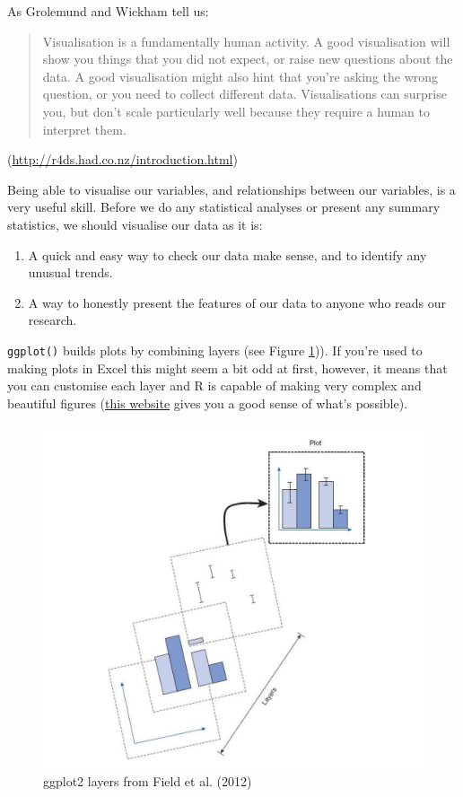 \documentclass[
  oneside]{book}
\begin{document}
As Grolemund and Wickham tell us:

\begin{quote}
Visualisation is a fundamentally human activity. A good visualisation will show you things that you did not expect, or raise new questions about the data. A good visualisation might also hint that you're asking the wrong question, or you need to collect different data. Visualisations can surprise you, but don't scale particularly well because they require a human to interpret them.
\end{quote}

(\url{http://r4ds.had.co.nz/introduction.html})

Being able to visualise our variables, and relationships between our variables, is a very useful skill. Before we do any statistical analyses or present any summary statistics, we should visualise our data as it is:

\begin{enumerate}
\def\labelenumi{\arabic{enumi}.}
\item
  A quick and easy way to check our data make sense, and to identify any unusual trends.
\item
  A way to honestly present the features of our data to anyone who reads our research.
\end{enumerate}

\texttt{ggplot()} builds plots by combining layers (see Figure \ref{fig:img-layers})). If you're used to making plots in Excel this might seem a bit odd at first, however, it means that you can customise each layer and R is capable of making very complex and beautiful figures (\href{https://www.data-to-viz.com/}{this website} gives you a good sense of what's possible).

\begin{figure}

{\centering \includegraphics[width=1\linewidth]{images/layers} 

}

\caption{ggplot2 layers from Field et al. (2012)}\label{fig:img-layers}
\end{figure}
\end{document}
